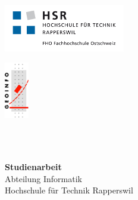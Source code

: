 \begin{titlepage}
\begin{flushleft}

\noindent\begin{minipage}[t]{0.49\textwidth}
	\begin{flushleft}
		\vspace{0pt} %
		\includegraphics[width=200px]{./images/logo-hsr}
	\end{flushleft}
\end{minipage}
\hfill
\begin{minipage}[t]{0.49\textwidth}
	\begin{flushright}
		\vspace{0pt} %
		\includegraphics[width=40px]{./images/logo-geoinfo}
	\end{flushright}
\end{minipage}
\\[1.5cm]

\\[1.5cm]

\begin{center}
{\Large \bfseries Studienarbeit}\\[0.5cm]
{\Large
	Abteilung Informatik \\[0.2cm]
	Hochschule für Technik Rapperswil
}\\[1.5cm]
\end{center}

\\[1.5cm]


\end{flushleft}
\end{titlepage}
